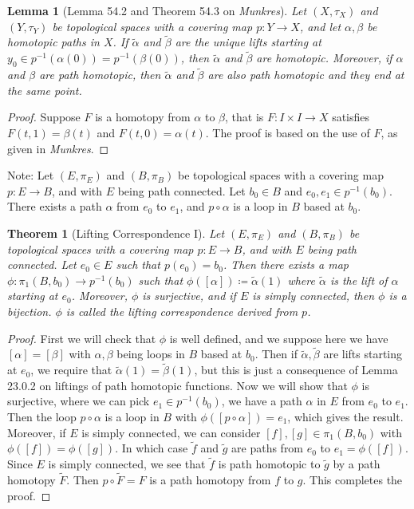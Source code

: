 \documentclass[11pt]{book}
\theoremstyle{break}
\theoremstyle{break}
\newtheorem{thm}{Theorem}[section]
\newtheorem{lem}{Lemma}[thm]
\newcommand{\that}[1]{\widetilde{#1}}
\newcommand{\note}{\color{red}Note: \color{black}}
\begin{document}
\begin{lem}[Lemma 54.2 and Theorem 54.3 on \textit{Munkres}]Let $(X,\tau_X)$ and $(Y,\tau_Y)$ be topological spaces with a covering map $p:Y \to X$, and let $\alpha,\beta$ be homotopic paths in $X$. If $\that{\alpha}$ and $\that{\beta}$ are the unique lifts starting at $y_0 \in p^{-1}(\alpha(0)) = p^{-1}(\beta(0))$, then $\that{\alpha}$ and $\that{\beta}$ are homotopic. Moreover, if $\alpha$ and $\beta$ are path homotopic, then $\that{\alpha}$ and $\that{\beta}$ are also path homotopic and they end at the same point. 
\end{lem}
\begin{proof}
Suppose $F$ is a homotopy from $\alpha$ to $\beta$, that is $F:I \times I \to X$ satisfies $F(t,1) = \beta(t)$ and $F(t,0) = \alpha(t)$. The proof is based on the use of $F$, as given in \textit{Munkres}. 
\end{proof}

\note Let $(E,\pi_E)$ and $(B,\pi_B)$ be topological spaces with a covering map $p:E \to B$, and with $E$ being path connected. Let $b_0 \in B$ and $e_0, e_1 \in p^{-1}(b_0)$. There exists a path $\alpha$ from $e_0$ to $e_1$, and $p\circ \alpha$ is a loop in $B$ based at $b_0$.  

\begin{thm}[Lifting Correspondence I]
Let $(E,\pi_E)$ and $(B,\pi_B)$ be topological spaces with a covering map $p:E \to B$, and with $E$ being path connected. Let $e_0 \in E$ such that $p(e_0) = b_0$. Then there exists a map $\phi: \pi_1(B, b_0) \to p^{-1}(b_0)$ such that $\phi([\alpha]) \coloneqq \that{\alpha}(1)$ where $\that{\alpha}$ is the lift of $\alpha$ starting at $e_0$. Moreover, $\phi$ is surjective, and if $E$ is simply connected, then $\phi$ is a bijection. $\phi$ is called the lifting correspondence derived from $p$. 
\end{thm}
\begin{proof}
First we will check that $\phi$ is well defined, and we suppose here we have $[\alpha ] = [\beta]$ with $\alpha,\beta$ being loops in $B$ based at $b_0$. Then if $\that{\alpha}, \that{\beta}$ are lifts starting at $e_0$, we require that $\that{\alpha}(1) = \that{\beta}(1)$, but this is just a consequence of Lemma 23.0.2 on liftings of path homotopic functions. Now we will show that $\phi$ is surjective, where we can pick $e_1 \in p^{-1}(b_0)$, we have a path $\alpha$ in $E$ from $e_0$ to $e_1$. Then the loop $p\circ \alpha$ is a loop in $B$ with $\phi([p \circ \alpha]) = e_1$, which gives the result. Moreover, if $E$ is simply connected, we can consider $[f],[g] \in \pi_1(B, b_0)$ with $\phi([f]) = \phi([g])$. In which case $\that{f}$ and $\that{g}$ are paths from $e_0$ to $e_1 = \phi([f])$. Since $E$ is simply connected, we see that $\that{f}$ is path homotopic to $\that{g}$ by a path homotopy $\that{F}$. Then $p \circ \that{F} = F$ is a path homotopy from $f$ to $g$. This completes the proof.
\end{proof}
\end{document}

